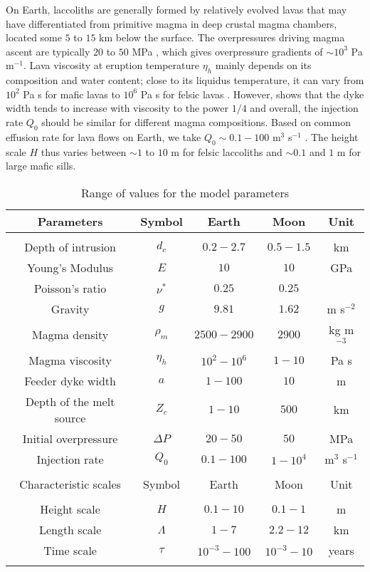 On Earth, laccoliths are generally  formed by relatively evolved lavas
that  may have  differentiated from  primitive magma  in deep  crustal
magma chambers,  located some $5$  to $15$  km below the  surface. The
overpressures  driving magma  ascent are  typically $20$  to $50$  MPa
\citep{Stasiuk:1993kg,Barmin:2002ea},    which   gives    overpressure
gradients  of $\sim  10^3$ Pa  m$^{-1}$.  Lava  viscosity at  eruption
temperature  $\eta_h$  mainly depends  on  its  composition and  water
content; close to its liquidus temperature, it can vary from $10^2$ Pa
s   for   mafic   lavas   to   $10^{6}$  Pa   s   for   felsic   lavas
\citep{Anonymous:CZVBrBvv,Giordano:2008em,Whittington:2009fv,Chevrel:2013jn}. However,
\citet{Wada:2007tv} shows that  the dyke width tends  to increase with
viscosity  to the  power  $1/4$ \citep{Kerr:1995tl}  and overall,  the
injection   rate  $Q_0$   should  be   similar  for   different  magma
compositions.  Based on common effusion  rate for lava flows on Earth,
we       take       $Q_0\sim       0.1-100$       m$^3$       s$^{-1}$
\citep{Pieri:1986bf,Harris:2000jd,Castro:2013jo,Tuffen:2013di}.    The
height scale  $H$ thus varies  between $\sim 1$  to $10$ m  for felsic
laccoliths and $\sim0.1$ and $1$ m for large mafic sills.

\begin{table}[h!]
  \caption{Range of values for the model parameters}
  \centering
  \begin{tabular}{c|c|c|c|c}
    Parameters& Symbol & Earth & Moon&Unit\\
    \hline
              &&&&\\
    Depth of intrusion & $d_c$ & $0.2-2.7$ &$0.5-1.5$ &km \\
    Young's Modulus & $E$ & $10$ &$10$ &GPa \\
    Poisson's ratio & $\nu^*$ & $0.25$ &$0.25$ &\\
    Gravity & $g$ & $9.81$ &$1.62$&m s$^{-2}$ \\
    Magma density & $\rho_{m}$ & $2500-2900$ &$2900$&kg m$^{-3}$ \\
    Magma viscosity & $\eta_h $ & $10^2-10^{6}$ &$1-10$&Pa s \\
    Feeder dyke width & $a$ & $1-100$ &$10$&m \\
    Depth of the melt source & $Z_{c}$ & $ 1-10$&$ 500$& km \\ 
    Initial overpressure & $\Delta P$ & $20-50$ &$50$ &MPa \\
    Injection rate & $Q_{0}$ &$0.1-100$ &$1-10^4$&m$^{3}$ s$^{-1}$ \\
              &&&&\\
    \hline
    Characteristic scales & Symbol & Earth & Moon&Unit\\
    \hline
              &&&&\\
    Height scale & $H$& $0.1-10$ &$0.1-1$ &m \\
    Length scale & $\Lambda$ & $1-7$&$2.2-12$& km \\
    Time scale & $\tau$ & $10^{-3}-100$&$10^{-3}-10$& years \\
    \label{C2-tab2}
  \end{tabular} 
\end{table}

